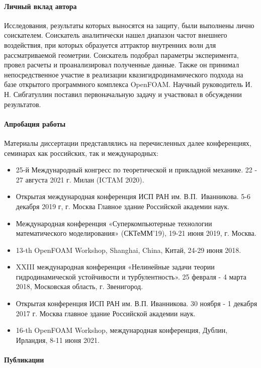 \documentclass[utf8x]{G7-32} %
\begin{document}
\paragraph{Личный вклад автора}

Исследования, результаты которых выносятся на защиту, были выполнены лично соискателем. Соискатель аналитически нашел диапазон частот внешнего воздействия, при которых образуется аттрактор внутренних волн для рассматриваемой геометрии. Соискатель подобрал параметры эксперимента, провел расчеты и проанализировал полученные данные. Также он принимал непосредственное участие в реализации квазигидродинамического подхода на базе открытого программного комплекса OpenFOAM. Научный руководитель И. Н. Сибгатуллин поставил первоначальную задачу и участвовал в обсуждении результатов. 

\paragraph{Апробация работы}

Материалы диссертации представлялись на перечисленных далее конференциях, семинарах как российских, так и международных:

\begin{itemize}
  \item 25-й Международный конгресс по теоретической и прикладной механике. 22 - 27 августа 2021 г. Милан (ICTAM 2020).
  \item Открытая международная конференция ИСП РАН им. В.П.~Иванникова. 5-6 декабря 2019 г, г. Москва Главное здание Российской академии наук.
  \item Международная конференция «Суперкомпьютерные технологии математического моделирования» (СКТеММ’19), 19-21 июня 2019, г. Москва.
  \item 13-th OpenFOAM Workshop, Shanghai, China, Китай, 24-29 июня 2018.
  \item XXIII международная конференция «Нелинейные задачи теории гидродинамической устойчивости и турбулентность». 25 февраля - 4 марта 2018, Московская область, г. Звенигород.
  \item Открытая конференция ИСП РАН им. В.П. Иванникова. 30 ноября - 1 декабря 2017 г. Москва главное здание Российской академии наук.
  \item 16-th OpenFOAM Workshop, международная конференция, Дублин, Ирландия, 8-11 июня 2021. 
\end{itemize}

\paragraph{Публикации}
\end{document}
